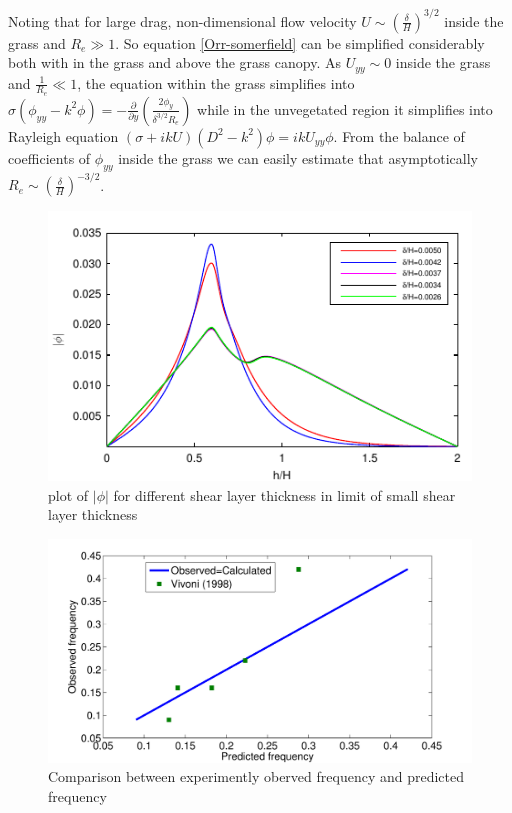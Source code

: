 \documentclass[aps,prl,twocolumn,showpacs,superscriptaddress,groupedaddress,10pt]{revtex4-1}  %
\newcommand{\del}{\partial}
\begin{document}
Noting that for large drag, non-dimensional flow velocity $U \sim (\frac{\delta}{H})^{3/2}$ inside the grass and $R_{e} \gg 1$. So equation \eqref{Orr-somerfield}
can be simplified considerably both with in the grass and above the grass canopy. As $U_{yy}\sim 0$ inside the grass and $\frac{1}{R_e} \ll 1$,
the equation within the grass simplifies into
$\sigma\left(\phi_{yy}-k^2\phi\right) = -\frac{\del}{\del y}\left(\frac{2\phi_y}{\delta^{3/2}R_e}\right)$ while in the unvegetated region it simplifies into Rayleigh equation 
$ \left(\sigma+ikU\right) \left(D^2-k^2\right)\phi =  ikU_{yy}\phi$. From the balance of coefficients of $\phi_{yy}$ inside the grass we can easily estimate that asymptotically 
$R_e \sim (\frac{\delta}{H})^{-3/2}$.
\begin{figure}[]
\includegraphics[]{Asymptotic_eig_set3.pdf}
\caption{plot of $|\phi|$ for different shear layer thickness in limit of small shear layer thickness}
\label{Asymptotic_mode}
\end{figure}
\begin{figure}[htb]
\includegraphics[scale=0.34]{Observed_vs_calculated}
\caption{Comparison between experimently oberved frequency and predicted frequency}
\label{Observed_calculated}
\end{figure}
\end{document}
